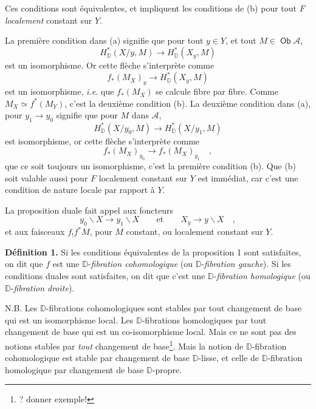 \documentclass[11pt]{article}
\newcommand{\printedpage}[1]{\marginpar{\footnotesize p.~#1}}
\newcommand{\msp}[1]{\marginpar{\footnotesize [#1]}}
\newcommand{\D}{\mathbb{D}}
\newcommand{\Ob}{\mathop{\mathsf{Ob}}}
\newcommand{\bs}{\backslash}
\begin{document}
Ces conditions sont équivalentes, et impliquent les conditions de (b) pour tout $F$ \textit{localement} constant sur $Y$.

La première condition dans (a) signifie que pour tout $y \in Y$, et tout $M \in \Ob \mathcal{A}$,
\[
H^*_{\D}(X/y, M) \longrightarrow H^*_{\D}(X_y, M)
\]
est un isomorphisme. Or cette flèche s'interprète comme
\[
f_*(M_X)_y \longrightarrow H^*_{\D}(X_y, M)
\]
est un isomorphisme, \textit{i.e.} que $f_*(M_X)$ se calcule fibre par fibre. Comme $M_X \simeq f^*(M_Y)$, c'est la deuxième condition (b). La deuxième condition dans (a), pour $y_1 \to y_0$ signifie que pour $M$ dans $\mathcal{A}$,
\[
H^*_{\D}(X/y_0, M) \longrightarrow H^*_{\D}(X/y_1, M)
\]
est isomorphisme, or cette flèche s'interprète comme
\[
f_*(M_X)_{y_0} \longrightarrow f_*(M_X)_{y_1} \quad ,
\]
que ce soit toujours un isomorphisme, c'est la première condition (b). Que (b) soit valable aussi pour $F$ localement constant sur $Y$ est immédiat, car c'est une condition de nature locale par rapport à $Y$.

\msp{page 77}

La proposition duale fait appel aux foncteurs
\[
y_0\bs X \longrightarrow y_1\bs X \qquad \text{et} \qquad X_y \longrightarrow y\bs X \quad ,
\]
et aux faisceaux $f_!f^*M$, pour $M$ constant, ou localement constant sur $Y$.

\printedpage{47}
\textbf{Définition 1.} Si les conditions équivalentes de la proposition 1 sont satisfaites, on dit que $f$ est une $\D$-\textit{fibration cohomologique} (ou $\D$-\textit{fibration gauche}). Si les conditions duales sont satisfaites, on dit que c'est une $\D$-\textit{fibration homologique} (ou $\D$-\textit{fibration droite}).

N.B. Les $\D$-fibrations cohomologiques sont stables par tout changement de base qui est un isomorphisme local. Les $\D$-fibrations homologiques par tout changement de base qui est un co-isomorphisme local. Mais ce ne sont pas des notions stables par \textit{tout} changement de base\footnote[34]{? donner exemple!}. Mais la notion de $\D$-fibration cohomologique est stable par changement de base $\D$-lisse, et celle de $\D$-fibration homologique par changement de base $\D$-propre.
\end{document}
